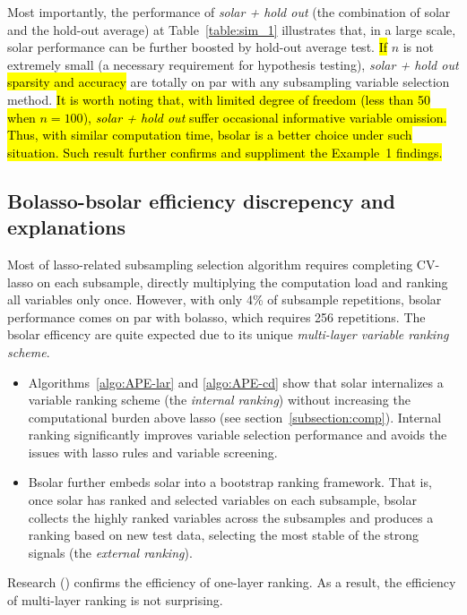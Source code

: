 \documentclass[12pt]{article}
\begin{document}
Most importantly, the performance of \emph{solar + hold out} (the combination of solar and the hold-out average) at Table~\ref{table:sim_1} illustrates that, in a large scale, solar performance can be further boosted by hold-out average test. \hl{If} $n$ is not extremely small (a necessary requirement for hypothesis testing), \emph{solar + hold out} \hl{sparsity and accuracy} are totally on par with any subsampling variable selection method. \hl{It is worth noting that, with limited degree of freedom (less than 50 when $n=100$), \emph{solar + hold out} suffer occasional informative variable omission. Thus, with similar computation time, bsolar is a better choice under such situation. Such result further confirms and suppliment the Example~1 findings.}

\subsection{Bolasso-bsolar efficiency discrepency and explanations}

Most of lasso-related subsampling selection algorithm requires completing CV-lasso on each subsample, directly multiplying the computation load and ranking all variables only once. However, with only 4\% of subsample repetitions, bsolar performance comes on par with bolasso, which requires 256 repetitions. The bsolar efficency are quite expected due to its unique \emph{multi-layer variable ranking scheme}.

\begin{itemize}
  \item Algorithms~\ref{algo:APE-lar} and \ref{algo:APE-cd} show that solar internalizes a variable ranking scheme (the \emph{internal ranking}) without increasing the computational burden above lasso (see section~\ref{subsection:comp}). Internal ranking significantly improves variable selection performance and avoids the issues with lasso rules and variable screening.

  \item Bsolar further embeds solar into a bootstrap ranking framework. That is, once solar has ranked and selected variables on each subsample, bsolar collects the highly ranked variables across the subsamples and produces a ranking based on new test data, selecting the most stable of the strong signals (the \emph{external ranking}).
\end{itemize}

\noindent
Research (\citet{fan2008sure, hall2009usingb, hall2009using, li2012robust, li2012feature}) confirms the efficiency of one-layer ranking. As a result, the efficiency of multi-layer ranking is not surprising.
\end{document}

